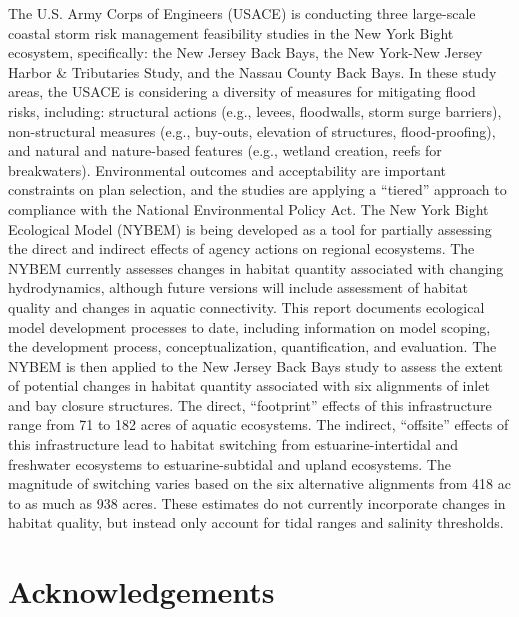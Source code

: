 \documentclass[
]{book}
\begin{document}
The U.S. Army Corps of Engineers (USACE) is conducting three large-scale coastal storm risk management feasibility studies in the New York Bight ecosystem, specifically: the New Jersey Back Bays, the New York-New Jersey Harbor \& Tributaries Study, and the Nassau County Back Bays. In these study areas, the USACE is considering a diversity of measures for mitigating flood risks, including: structural actions (e.g., levees, floodwalls, storm surge barriers), non-structural measures (e.g., buy-outs, elevation of structures, flood-proofing), and natural and nature-based features (e.g., wetland creation, reefs for breakwaters). Environmental outcomes and acceptability are important constraints on plan selection, and the studies are applying a ``tiered'' approach to compliance with the National Environmental Policy Act. The New York Bight Ecological Model (NYBEM) is being developed as a tool for partially assessing the direct and indirect effects of agency actions on regional ecosystems. The NYBEM currently assesses changes in habitat quantity associated with changing hydrodynamics, although future versions will include assessment of habitat quality and changes in aquatic connectivity. This report documents ecological model development processes to date, including information on model scoping, the development process, conceptualization, quantification, and evaluation. The NYBEM is then applied to the New Jersey Back Bays study to assess the extent of potential changes in habitat quantity associated with six alignments of inlet and bay closure structures. The direct, ``footprint'' effects of this infrastructure range from 71 to 182 acres of aquatic ecosystems. The indirect, ``offsite'' effects of this infrastructure lead to habitat switching from estuarine-intertidal and freshwater ecosystems to estuarine-subtidal and upland ecosystems. The magnitude of switching varies based on the six alternative alignments from 418 ac to as much as 938 acres. These estimates do not currently incorporate changes in habitat quality, but instead only account for tidal ranges and salinity thresholds.

\hypertarget{acknowledgements}{%
\section*{Acknowledgements}\label{acknowledgements}}
\end{document}
